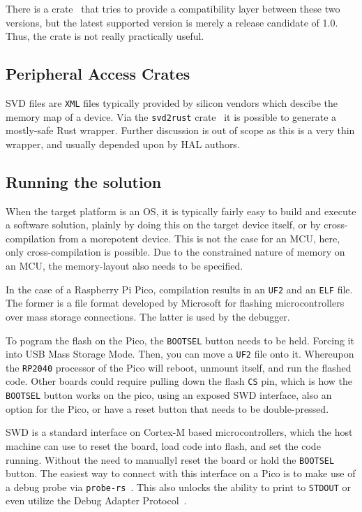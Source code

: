 There is a crate~\cite{gh:ehcl} that tries to provide a compatibility layer between these two versions, but the latest supported version is merely a release candidate of 1.0. Thus, the crate is not really practically useful.

\subsection{Peripheral Access Crates}

\gls{SVD} files are \texttt{XML} files typically provided by silicon vendors which descibe the memory map of a device. Via the \texttt{svd2rust} crate~\cite{crates:svd2rust} it is possible to generate a mostly-safe Rust wrapper. Further discussion is out of scope as this is a very thin wrapper, and usually depended upon by \gls{HAL} authors.

\subsection{Running the solution}
\label{sec:running}

When the target platform is an \gls{OS}, it is typically fairly easy to build and execute a software solution, plainly by doing this on the target device itself, or by cross-compilation from a morepotent device. This is not the case for an \gls{MCU}, here, only cross-compilation is possible. Due to the constrained nature of memory on an \gls{MCU}, the memory-layout also needs to be specified.

In the case of a Raspberry Pi Pico, compilation results in an \texttt{UF2} and an \texttt{ELF} file. The former is a file format developed by Microsoft for flashing microcontrollers over mass storage connections. The latter is used by the debugger.

To pogram the flash on the Pico, the \texttt{BOOTSEL} button needs to be held. Forcing it into USB Mass Storage Mode. Then, you can move a \texttt{UF2} file onto it. Whereupon the \texttt{RP2040} processor of the Pico will reboot, unmount itself, and run the flashed code. Other boards could require pulling down the flash \texttt{CS} pin, which is how the \texttt{BOOTSEL} button works on the pico, using an exposed \gls{SWD} interface, also an option for the Pico, or have a reset button that needs to be double-pressed.

\gls{SWD} is a standard interface on Cortex-M based microcontrollers, which the host machine can use to reset the board, load code into flash, and set the code running. Without the need to manuallyl reset the board or hold the \texttt{BOOTSEL} button. The easiest way to connect with this interface on a Pico is to make use of a debug probe via \texttt{probe-rs}~\cite{probe-rs}. This also unlocks the ability to print to \texttt{STDOUT} or even utilize the Debug Adapter Protocol~\cite{dap}.


